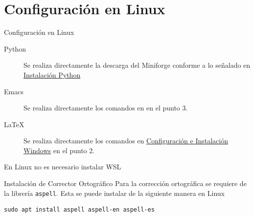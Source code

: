 \documentclass[presentation]{beamer}
\begin{document}
\section{Configuración en Linux}
\label{sec:org6a313fb}
\begin{frame}[label={sec:org8ef5bd1}]{Configuración en Linux}
\begin{description}
\item[{Python}] Se realiza directamente la descarga del Miniforge conforme a lo
señalado en \hyperlink{sec:org487af33}{Instalación Python}
\item[{Emacs}] Se realiza directamente los comandos en  en el punto 3.
\item[{\LaTeX}] Se realiza directamente los comandos en
\hyperlink{org3f7c0a5}{Configuración e Instalación Windows} en el punto 2.
\end{description}

En Linux \alert{\alert{no}} es necesario instalar \alert{\alert{WSL}}
\end{frame}
\begin{frame}[label={sec:org4be19a7},fragile]{Instalación de Corrector Ortográfico}
 Para la corrección ortográfica se requiere de la librería \texttt{aspell}. Esta se puede instalar de la siguiente manera en Linux
\begin{verbatim}
sudo apt install aspell aspell-en aspell-es
\end{verbatim}
\end{frame}
\end{document}

